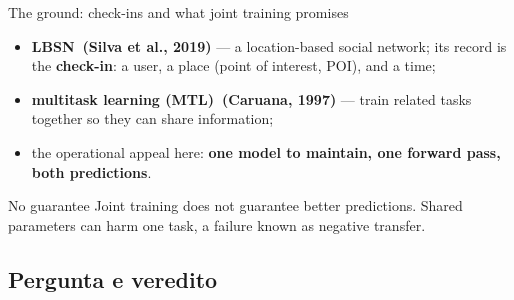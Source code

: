 \documentclass{beamer}
\begin{document}
\begin{frame}{The ground: check-ins and what joint training promises}
    \begin{itemize}\setlength{\itemsep}{4pt}
        \item \textbf{LBSN~{\scriptsize(Silva et al., 2019)}} --- a location-based social network; its record is the
              \textbf{check-in}: a user, a place (point of interest, POI), and a time;
        \item \textbf{multitask learning (MTL)~{\scriptsize(Caruana, 1997)}} --- train related tasks together so they can
              share information;
        \item the operational appeal here: \textbf{one model to maintain, one forward pass,
              both predictions}.
    \end{itemize}

    \bigskip
    \begin{alertblock}{No guarantee}
        \small
        Joint training does not guarantee better predictions. Shared parameters can harm one
        task, a failure known as \alert{negative transfer}.
    \end{alertblock}
\end{frame}

\subsection{Pergunta e veredito}
\end{document}
